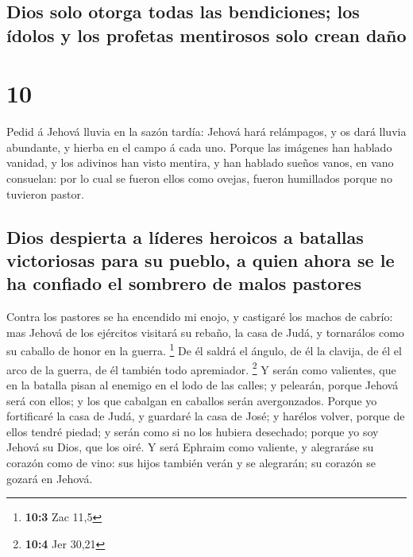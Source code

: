 \hypertarget{dios-solo-otorga-todas-las-bendiciones-los-uxeddolos-y-los-profetas-mentirosos-solo-crean-dauxf1o}{%
\subsection{Dios solo otorga todas las bendiciones; los ídolos y los
profetas mentirosos solo crean
daño}\label{dios-solo-otorga-todas-las-bendiciones-los-uxeddolos-y-los-profetas-mentirosos-solo-crean-dauxf1o}}

\hypertarget{section-9}{%
\section{10}\label{section-9}}

 Pedid á Jehová lluvia en la sazón tardía: Jehová hará
relámpagos, y os dará lluvia abundante, y hierba en el campo á cada uno.
 Porque las imágenes han hablado vanidad, y los adivinos
han visto mentira, y han hablado sueños vanos, en vano consuelan: por lo
cual se fueron ellos como ovejas, fueron humillados porque no tuvieron
pastor.

\hypertarget{dios-despierta-a-luxedderes-heroicos-a-batallas-victoriosas-para-su-pueblo-a-quien-ahora-se-le-ha-confiado-el-sombrero-de-malos-pastores}{%
\subsection{Dios despierta a líderes heroicos a batallas victoriosas
para su pueblo, a quien ahora se le ha confiado el sombrero de malos
pastores}\label{dios-despierta-a-luxedderes-heroicos-a-batallas-victoriosas-para-su-pueblo-a-quien-ahora-se-le-ha-confiado-el-sombrero-de-malos-pastores}}

 Contra los pastores se ha encendido mi enojo, y castigaré
los machos de cabrío: mas Jehová de los ejércitos visitará su rebaño, la
casa de Judá, y tornarálos como su caballo de honor en la guerra.
\footnote{\textbf{10:3} Zac 11,5}  De él saldrá el ángulo,
de él la clavija, de él el arco de la guerra, de él también todo
apremiador. \footnote{\textbf{10:4} Jer 30,21}  Y serán
como valientes, que en la batalla pisan al enemigo en el lodo de las
calles; y pelearán, porque Jehová será con ellos; y los que cabalgan en
caballos serán avergonzados.  Porque yo fortificaré la
casa de Judá, y guardaré la casa de José; y harélos volver, porque de
ellos tendré piedad; y serán como si no los hubiera desechado; porque yo
soy Jehová su Dios, que los oiré.  Y será Ephraim como
valiente, y alegraráse su corazón como de vino: sus hijos también verán
y se alegrarán; su corazón se gozará en Jehová.

